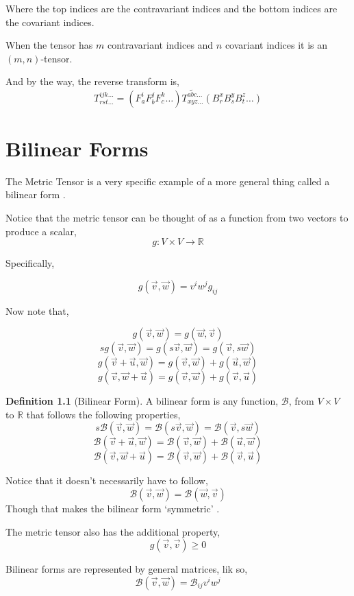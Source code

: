 \documentclass[12pt]{book}
\theoremstyle{plain}
\theoremstyle{definition}
\newtheorem{definition}{Definition}[chapter]
\theoremstyle{ppart}
\theoremstyle{case}
\theoremstyle{solution}
\begin{document}
Where the top indices are the contravariant indices
and the bottom indices are the covariant indices.

When the tensor has $m$ contravariant indices and $n$ covariant indices
it is an $(m,n)$-tensor.

And by the way, the reverse transform is,
\[
  T^{ijk\dots}_{rst\dots}
  =
  (F^i_a F^j_b F^k_c \dots) 
  \widetilde{T^{abc\dots}_{xyz\dots}}
  (B^x_r B^y_s B^z_t \dots) 
\]

\chapter{Bilinear Forms}

The Metric Tensor is a very specific example of a more general thing called a bilinear form \cite{youtube:tensor9}.

Notice that the metric tensor can be thought of as a function from two vectors to produce a scalar,
\[ g: V \times V \to \mathbb{R} \]

Specifically,

\[ g(\vec{v}, \vec{w}) = v^i w^j g_{ij} \]

Now note that,

\[ g(\vec{v}, \vec{w}) = g(\vec{w}, \vec{v}) \]
\[ s g(\vec{v}, \vec{w}) = g(s \vec{v}, \vec{w}) =  g(\vec{v}, s \vec{w}) \]
\[ g(\vec{v}+\vec{u}, \vec{w}) = g(\vec{v}, \vec{w}) + g(\vec{u}, \vec{w})\]
\[ g(\vec{v}, \vec{w}+\vec{u}) = g(\vec{v}, \vec{w}) + g(\vec{v}, \vec{u}) \]

\begin{definition}[Bilinear Form]
A bilinear form is any function, $\mathcal{B}$, from $V \times V$ to $\mathbb{R}$ that follows
the following properties,
\[ s \mathcal{B}(\vec{v}, \vec{w}) = \mathcal{B}(s \vec{v}, \vec{w}) =  \mathcal{B}(\vec{v}, s \vec{w}) \]
\[ \mathcal{B}(\vec{v}+\vec{u}, \vec{w}) = \mathcal{B}(\vec{v}, \vec{w}) + \mathcal{B}(\vec{u}, \vec{w})\]
\[ \mathcal{B}(\vec{v}, \vec{w}+\vec{u}) = \mathcal{B}(\vec{v}, \vec{w}) + \mathcal{B}(\vec{v}, \vec{u}) \]

Notice that it doesn't necessarily have to follow,
\[ \mathcal{B}(\vec{v}, \vec{w}) = \mathcal{B}(\vec{w}, \vec{v}) \]
Though that makes the bilinear form `symmetric' \cite{wiki:bilinear}.
\end{definition}

The metric tensor also has the additional property,
\[ g(\vec{v}, \vec{v}) \ge 0 \]

Bilinear forms are represented by general matrices, lik so,
\[ \mathcal{B}(\vec{v}, \vec{w}) = \mathcal{B}_{ij} v^i w^j \]
\end{document}
